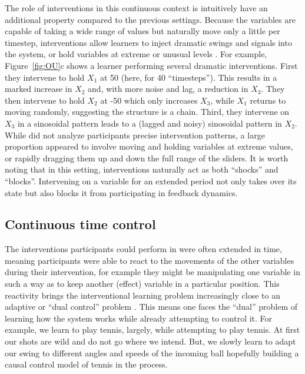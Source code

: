 \documentclass{cambridge7A}%
\def\citeapos#1{\citeauthor{#1}'s (\citeyear{#1})}
\begin{document}
The role of interventions in this continuous context is intuitively have an additional property compared to the previous settings.  Because the variables are capable of taking a wide range of values but naturally move only a little per timestep, interventions allow learners to inject dramatic swings and signals into the system, or hold variables at extreme or unusual levels \citep[Figure~\ref{fig:OU},][]{davis2018ctcv}.  For example, Figure~\ref{fig:OU}c shows a learner performing several dramatic interventions.  First they intervene to hold $X_1$ at 50 (here, for 40 ``timesteps'').  This results in a marked increase in $X_2$ and, with more noise and lag, a reduction in $X_3$.  They then intervene to hold $X_2$ at -50 which only increases $X_3$, while $X_1$ returns to moving randomly, suggesting the structure is a chain.  Third, they intervene on $X_3$ in a sinosoidal pattern leads to a (lagged and noisy) sinosoidal pattern in $X_2$.  While \cite{davis2018ctcv} did not analyze participants precise intervention patterns, a large proportion appeared to involve moving and holding variables at extreme values, or rapidly dragging them up and down the full range of the sliders.  It is worth noting that in this setting, interventions naturally act as both ``shocks'' and ``blocks''.  Intervening on a variable for an extended period not only takes over its state but also blocks it from participating in feedback dynamics.

\subsection{Continuous time control}

The interventions participants could perform in \cite{davis2018control} were often extended in time, meaning participants were able to react to the movements of the other variables during their intervention, for example they might be manipulating one variable in such a way as to keep another (effect) variable in a particular position.  %
This reactivity brings the interventional learning problem increasingly close to an adaptive or ``dual control'' problem \citep{feldbaum1961dual,guez2015phd,klenske2016dual,schulz2017control}. This means one faces the ``dual'' problem of learning how the system works while already attempting to control it. For example, we learn to play tennis, largely, while attempting to play tennis. At first our shots are wild and do not go where we intend. But, we slowly learn to adapt our swing to different angles and speeds of the incoming ball hopefully building a causal control model of tennis in the process.
\end{document}
